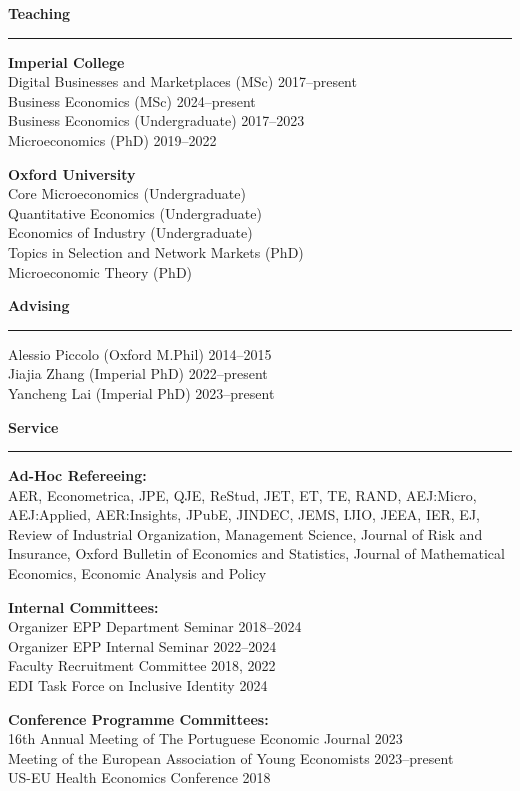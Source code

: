 \documentclass[11pt,a4paper]{article}
\newenvironment{rSection}[1]{%
  \vspace{0.5em}%
  \noindent\textbf{\large #1}%
  \vspace{0.3em}\par
  \hrule
  \vspace{0.5em}
}{%
  \vspace{0.8em}
}
\begin{document}
\begin{rSection}{Teaching}

\textbf{Imperial College} \\ 
Digital Businesses and Marketplaces (MSc) \hfill 2017--present \\ 
Business Economics (MSc) \hfill 2024--present \\ 
Business Economics (Undergraduate) \hfill 2017--2023 \\  
Microeconomics (PhD) \hfill 2019--2022

\vspace{0.4em}

\textbf{Oxford University} \\
Core Microeconomics (Undergraduate) \\ 
Quantitative Economics (Undergraduate) \\ 
Economics of Industry (Undergraduate) \\ 
Topics in Selection and Network Markets (PhD) \\ 
Microeconomic Theory (PhD)
\end{rSection}

\begin{rSection}{Advising}
Alessio Piccolo (Oxford M.Phil) \hfill 2014--2015 \\
Jiajia Zhang (Imperial PhD) \hfill 2022--present \\
Yancheng Lai (Imperial PhD) \hfill 2023--present
\end{rSection}

\begin{rSection}{Service}

\textbf{Ad-Hoc Refereeing:} \\ 
AER, Econometrica, JPE, QJE, ReStud, 
JET, ET, TE, RAND, AEJ:Micro, AEJ:Applied, AER:Insights, 
JPubE, JINDEC, JEMS, IJIO, JEEA, IER, EJ, 
Review of Industrial Organization, Management Science, 
Journal of Risk and Insurance, Oxford Bulletin of Economics and Statistics, 
Journal of Mathematical Economics, Economic Analysis and Policy

\vspace{0.4em}

\textbf{Internal Committees:} \\
Organizer EPP Department Seminar \hfill 2018--2024 \\ 
Organizer EPP Internal Seminar \hfill 2022--2024 \\
Faculty Recruitment Committee \hfill 2018, 2022 \\
EDI Task Force on Inclusive Identity \hfill 2024

\vspace{0.4em}

\textbf{Conference Programme Committees:} \\
16th Annual Meeting of The Portuguese Economic Journal \hfill 2023 \\ 
Meeting of the European Association of Young Economists \hfill 2023--present \\ 
US-EU Health Economics Conference \hfill 2018 \\
\end{rSection}
\end{document}
